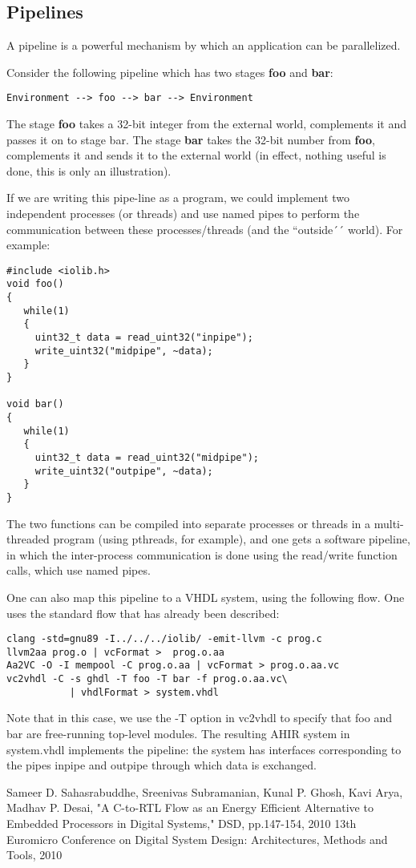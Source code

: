 \documentclass{article}
\begin{document}
\subsection{Pipelines}

A pipeline is a powerful mechanism by which an application
can be parallelized.

Consider the following pipeline which has two stages
{\bf foo} and {\bf bar}:  
\begin{verbatim}
Environment --> foo --> bar --> Environment
\end{verbatim}
The stage {\bf foo} takes a 32-bit
integer from the external world, complements it and passes it on to stage
bar.  The stage {\bf bar} takes the 32-bit number from {\bf foo}, complements
it and sends it to the external world (in effect, nothing useful
is done, this is only an illustration).

If we are writing this pipe-line as a program, we could implement
two independent processes (or threads) and use named pipes to
perform the communication between these processes/threads (and the
``outside´´ world).  For example:
\begin{verbatim}
#include <iolib.h>
void foo()
{
   while(1)
   {
     uint32_t data = read_uint32("inpipe");
     write_uint32("midpipe", ~data);
   }
}

void bar()
{
   while(1)
   {
     uint32_t data = read_uint32("midpipe");
     write_uint32("outpipe", ~data);
   }
}
\end{verbatim}
The two functions can be compiled into separate processes
or threads in a multi-threaded program (using pthreads, for
example), and one gets a software pipeline, in which
the inter-process communication is done using the
read/write function calls, which use named pipes.

One can also map this pipeline to a VHDL system, using the
following flow.  One uses the standard flow that has already
been described:
\begin{verbatim}
clang -std=gnu89 -I../../../iolib/ -emit-llvm -c prog.c
llvm2aa prog.o | vcFormat >  prog.o.aa
Aa2VC -O -I mempool -C prog.o.aa | vcFormat > prog.o.aa.vc
vc2vhdl -C -s ghdl -T foo -T bar -f prog.o.aa.vc\
           | vhdlFormat > system.vhdl
\end{verbatim}
Note that in this case, we use the -T option in vc2vhdl to
specify that foo and bar are free-running top-level modules.
The resulting AHIR system in system.vhdl implements the pipeline:
the system has interfaces corresponding to the pipes inpipe and
outpipe through which data is exchanged.

\begin{thebibliography}{99}
Sameer D. Sahasrabuddhe, Sreenivas Subramanian, Kunal P. Ghosh, Kavi Arya, Madhav P. Desai, 
"A C-to-RTL Flow as an Energy Efficient Alternative to Embedded Processors in Digital Systems," 
DSD, pp.147-154, 2010 13th Euromicro Conference on Digital 
System Design: Architectures, Methods and Tools, 2010
\end{thebibliography}
\end{document}
